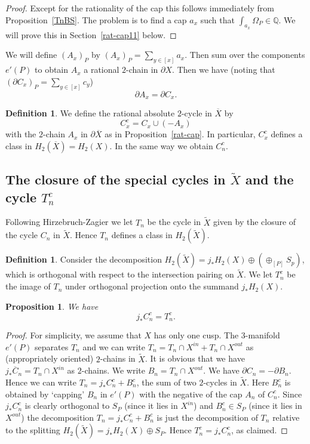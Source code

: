\documentclass[12pt,leqno]{amsart}
\numberwithin{equation}{section}
\theoremstyle{plain}
\newtheorem{proposition}[theorem]{Proposition}
\theoremstyle{definition}
\newtheorem{definition}[theorem]{Definition}
\theoremstyle{remark}
\newcommand{\Q}{\mathbb{Q}}
\begin{document}
\begin{proof}

Except for the rationality of the cap this follows immediately from Proposition~\ref{TnBS}. The problem is to find a cap $a_x$ such that $\int_{a_x} \Omega_P \in \Q$. We will prove this in Section~\ref{rat-cap11} below. 
\end{proof}

We will define $(A_x)_P$ by $(A_x)_P = \sum_{y \in [x]} a_x$. Then sum over the components $e'(P)$ to obtain $A_x$ a rational $2$-chain 
in $\partial X$. Then we have (noting that $(\partial C_x)_P = \sum_{y \in [x]} c_y$)
\[
\partial A_x = \partial C_x.
\]




\begin{definition}
We define the rational absolute $2$-cycle in $\overline{X}$ by 
\[
C_x^c = C_x \cup (-A_x)
\]
with the $2$-chain $A_x$  in $\partial \overline{X}$ as in Proposition~\ref{rat-cap}. In particular, $C_x^c$ defines a class in $H_2(\overline{X}) = H_2(X)$. In the same way we obtain $C_n^c$. 
\end{definition}


\subsection{The closure of the special cycles in $\tilde{X}$ and the cycle $T_n^c$}

Following Hirzebruch-Zagier we let $T_n$ be the cycle in $\tilde{X}$ given by the closure of the cycle $C_n$ in $\tilde{X}$. Hence $T_n$ defines a class in $H_2(\tilde{X})$.


\begin{definition}
Consider the decomposition $H_2(\tilde{X}) = j_{\ast} H_2(X) \oplus \left( \oplus_{[P]} S_{p
} \right)$, which is orthogonal with respect to the intersection pairing on $\tilde{X}$. We let $T_n^c$ be the image of $T_n$ under orthogonal projection onto the summand $j_{\ast} H_2(X)$.
\end{definition}

\begin{proposition}\label{CnTn}
We have
\[
j_{\ast} C_n^c = T_n^c.
\]
\end{proposition}

\begin{proof}
For simplicity, we assume that $X$ has only one cusp. The $3$-manifold $e'(P)$ separates $T_n$
and  we can write $T_n = T_n \cap X^{in} + T_n \cap X^{out}$ as (appropriately oriented)  $2$-chains  in $\tilde{X}$. It is obvious that we have $j_{\ast} \overline{C}_n = T_n \cap X^{in}$ as $2$-chains. We write $B_n = T_n \cap X^{out}$. We have $\partial C_n = - \partial B_n$. Hence we can write $T_n = j_{\ast} C_n^c + B_n^c$, the sum of two  $2$-cycles in $\tilde{X}$. Here $B_n^c$ is obtained by `capping' $B_n$ in $e'(P)$ with the negative of the cap $A_n$ of $C_n^c$. 
Since  $j_*C_n^c$  is clearly orthogonal to $S_P$ (since it lies in $X^{in}$) and $B_n^c \in
S_P$ (since it lies in $X^{out}$)
the decomposition $T_n = j_*C_n^c + B_n^c$ is just the decomposition of
$T_n$ relative to the splitting $H_2(\tilde{X}) = j_*H_2(X)  \oplus S_P$.
Hence $T_n^c =  j_*C_n^c$, as claimed.
\end{proof}
\end{document}
